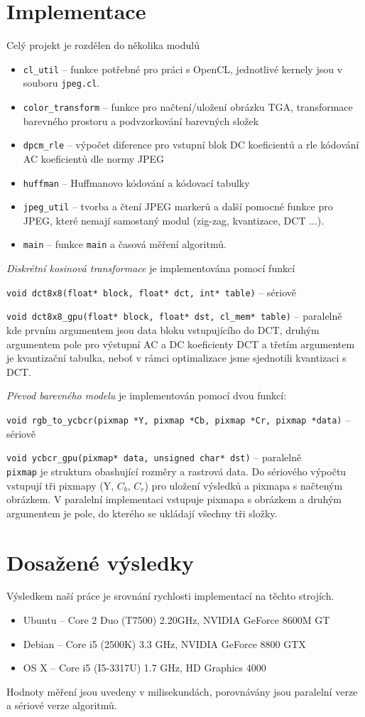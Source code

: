 \documentclass[a4paper,11pt]{article}
\begin{document}
\section{Implementace}
Celý projekt je rozdělen do několika modulů
\begin{itemize}
\item \texttt{cl\_util} -- funkce potřebné pro práci s OpenCL, jednotlivé kernely jsou v souboru \texttt{jpeg.cl}.
\item \texttt{color\_transform} -- funkce pro načtení/uložení obrázku TGA, transformace barevného prostoru a podvzorkování barevných složek 
\item \texttt{dpcm\_rle} -- výpočet diference pro vstupní blok DC koeficientů a rle kódování AC koeficientů dle normy JPEG
\item \texttt{huffman} -- Huffmanovo kódování a kódovací tabulky
\item \texttt{jpeg\_util} -- tvorba a čtení JPEG markerů a další pomocné funkce pro JPEG, které nemají samostaný
modul (zig-zag, kvantizace, DCT ...).
\item \texttt{main} -- funkce \texttt{main} a časová měření algoritmů.
\end{itemize}
\textit{Diskrétní kosinová transformace} je implementována pomocí funkcí

\texttt{void dct8x8(float* block, float* dct, int* table)} -- sériově

\texttt{void dct8x8\_gpu(float* block, float* dst, cl\_mem* table)} -- paralelně\\
kde prvním argumentem jsou data bloku vstupujícího do DCT, druhým argumentem pole pro výstupní AC a DC koeficienty DCT
a třetím argumentem je kvantizační tabulka, neboť v rámci optimalizace jsme sjednotili kvantizaci s DCT.

\textit{Převod barevného modelu} je implementován pomocí dvou funkcí:

\texttt{void rgb\_to\_ycbcr(pixmap *Y, pixmap *Cb, pixmap *Cr, pixmap *data)} -- sériově

\texttt{void ycbcr\_gpu(pixmap* data, unsigned char* dst)} -- paralelně\\
\texttt{pixmap} je struktura obashující rozměry a rastrová data. Do sériového výpočtu vstupují tři pixmapy (Y, $C_b$, $C_r$) pro uložení výsledků a pixmapa s načteným obrázkem. V paralelní implementaci vstupuje pixmapa s obrázkem a druhým argumentem je pole, do kterého se ukládají všechny tři složky. 

\section{Dosažené výsledky}
Výsledkem naší práce je srovnání rychlosti implementací na těchto strojích.
\begin{itemize}
\item Ubuntu -- Core 2 Duo (T7500) 2.20GHz, NVIDIA GeForce 8600M GT
\item Debian -- Core i5 (2500K) 3.3 GHz, NVIDIA GeForce 8800 GTX
\item OS X -- Core i5 (I5-3317U) 1.7 GHz, HD Graphics 4000
\end{itemize}
Hodnoty měření jsou uvedeny v milisekundách, porovnávány jsou paralelní verze a sériové verze algoritmů.
\end{document}

